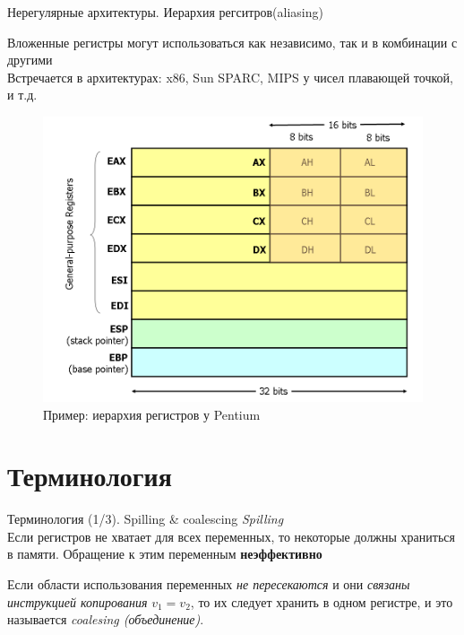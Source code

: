 \documentclass[aspectratio=169
  , xcolor={svgnames}
  , hyperref={ colorlinks,citecolor=DeepPink4
             , linkcolor=DarkRed,urlcolor=DarkBlue}
  , russian
  ]{beamer}
\theoremstyle{exerciseStyle1}
\begin{document}
\begin{frame}[fragile]{Нерегулярные архитектуры. Иерархия регситров(aliasing)}
\begin{minipage}{.4\textwidth}
Вложенные регистры могут использоваться как независимо, так и в комбинации с другими\\

Встречается в архитектурах: x86, Sun SPARC, MIPS у чисел плавающей точкой, и т.д.
\end{minipage}
\begin{minipage}{.58\textwidth}

\begin{figure}[h]
\includegraphics[scale=.35]{figures/x86-registers.png}
\caption{Пример: иерархия регистров у Pentium}
\end{figure}
\end{minipage}
\end{frame}

\section{Терминология}

\begin{frame}{Терминология (1/3). Spilling \& coalescing}
\emph{Spilling}\\
Если регистров не хватает для всех переменных, то некоторые должны храниться в памяти.
Обращение к этим переменным \textbf{неэффективно}\vspace{1cm}

Если области использования переменных \emph{не пересекаются} и они \emph{связаны инструкцией копирования} $v_1=v_2$, то их следует хранить в одном регистре, и это называется \emph{coalesing (объединение)}.
\end{frame}
\end{document}
